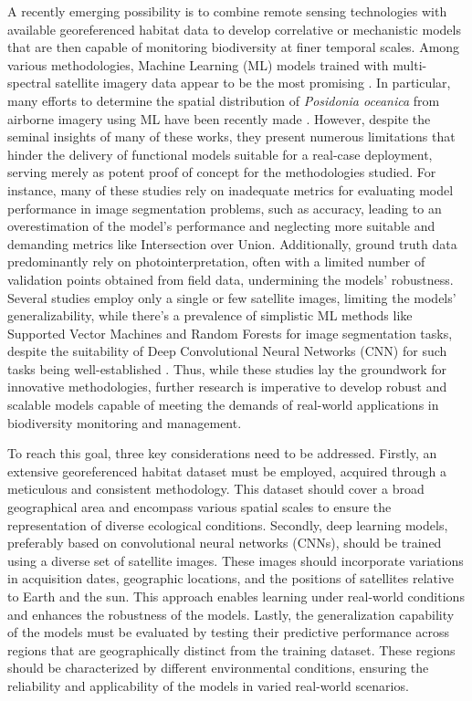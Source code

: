 A recently emerging possibility is to combine remote sensing technologies with
available georeferenced habitat data to develop correlative or mechanistic
models that are then capable of monitoring biodiversity at finer temporal
scales. Among various methodologies, Machine Learning (ML) models trained with
multi-spectral satellite imagery data appear to be the most promising
\cite{Zhang2013,Senecal2019,Wicaksono2019,Gudzius2021}. In particular, many
efforts to determine the spatial distribution
of \textit{Posidonia oceanica} from airborne imagery using ML have been
recently made
\cite{Chand2022,Jeon2021,case_study_Aegean_and_ionian_seas,Ariasari2019,comp_study_new_zeeld,MederosBarrera2022,Coffer2020,Marcello2018,Traganos2018c,Poursanidis2019,Duffy2019,Islam2019,Poursanidis2018,Traganos2018b,Traganos2018d,Bakirman2020,Kellaris2019,chowdhury2023ai}.
However, despite the seminal insights of many of these works, they present
numerous limitations that hinder the delivery of functional models suitable for
a real-case deployment, serving merely as potent proof of concept for the
methodologies studied. For instance, many of these studies rely on inadequate
metrics for evaluating model performance in image segmentation problems, such
as accuracy, leading to an overestimation of the model's performance and
neglecting more suitable and demanding metrics like Intersection over Union.
Additionally,
ground truth data predominantly rely on photointerpretation, often with a
limited number of validation points obtained from field data, undermining the
models' robustness. Several studies employ only a single
or few satellite images, limiting the models' generalizability, while there's a
prevalence of simplistic ML methods like Supported Vector Machines
and Random Forests for image segmentation tasks, despite the suitability of
Deep Convolutional Neural Networks (CNN) for such tasks being well-established
\cite{Zeiler2014,Milletari2016}.
Thus, while these studies lay the groundwork for innovative methodologies,
further research is imperative to develop robust and scalable models capable of
meeting the demands of real-world applications in biodiversity monitoring and
management.

To reach this goal, three key considerations need to be addressed.
Firstly, an extensive georeferenced habitat dataset must be employed, acquired
through a meticulous and consistent methodology. This dataset should cover a
broad geographical area and encompass various spatial scales to ensure the
representation of diverse ecological conditions. Secondly, deep learning
models, preferably based on convolutional neural networks (CNNs), should be
trained using a diverse set of satellite images. These images should
incorporate variations in acquisition dates, geographic locations, and the
positions of satellites relative to Earth and the sun. This approach enables
learning under real-world conditions and enhances the robustness of the models.
Lastly, the generalization capability of the models must be evaluated by
testing their predictive performance across regions that are geographically
distinct from the training dataset. These regions should be characterized by
different environmental conditions, ensuring the reliability and applicability
of the models in varied real-world scenarios.

